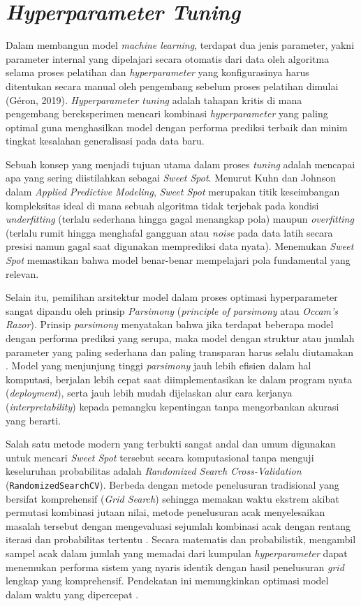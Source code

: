 \section{\textit{Hyperparameter Tuning}}\label{sec:hyperparameter_tuning}

Dalam membangun model \textit{machine learning}, terdapat dua jenis parameter, yakni parameter internal yang dipelajari secara otomatis dari data oleh algoritma selama proses pelatihan dan \textit{hyperparameter} yang konfigurasinya harus ditentukan secara manual oleh pengembang sebelum proses pelatihan dimulai (Géron, 2019). \textit{Hyperparameter tuning} adalah tahapan kritis di mana pengembang bereksperimen mencari kombinasi \textit{hyperparameter} yang paling optimal guna menghasilkan model dengan performa prediksi terbaik dan minim tingkat kesalahan generalisasi pada data baru.

Sebuah konsep yang menjadi tujuan utama dalam proses \textit{tuning} adalah mencapai apa yang sering diistilahkan sebagai \textit{Sweet Spot}. Menurut Kuhn dan Johnson  \cite{kuhn2013applied} dalam \textit{Applied Predictive Modeling}, \textit{Sweet Spot} merupakan titik keseimbangan kompleksitas ideal di mana sebuah algoritma tidak terjebak pada kondisi \textit{underfitting} (terlalu sederhana hingga gagal menangkap pola) maupun \textit{overfitting} (terlalu rumit hingga menghafal gangguan atau \textit{noise} pada data latih secara presisi namun gagal saat digunakan memprediksi data nyata). Menemukan \textit{Sweet Spot} memastikan bahwa model benar-benar mempelajari pola fundamental yang relevan.

Selain itu, pemilihan arsitektur model dalam proses optimasi hyperparameter sangat dipandu oleh prinsip \textit{Parsimony} (\textit{principle of parsimony} atau \textit{Occam's Razor}). Prinsip \textit{parsimony} menyatakan bahwa jika terdapat beberapa model dengan performa prediksi yang serupa, maka model dengan struktur atau jumlah parameter yang paling sederhana dan paling transparan harus selalu diutamakan \cite{kuhn2013applied}. Model yang menjunjung tinggi \textit{parsimony} jauh lebih efisien dalam hal komputasi, berjalan lebih cepat saat diimplementasikan ke dalam program nyata (\textit{deployment}), serta jauh lebih mudah dijelaskan alur cara kerjanya (\textit{interpretability}) kepada pemangku kepentingan tanpa mengorbankan akurasi yang berarti.

Salah satu metode modern yang terbukti sangat andal dan umum digunakan untuk mencari \textit{Sweet Spot} tersebut secara komputasional tanpa menguji keseluruhan probabilitas adalah \textit{Randomized Search Cross-Validation} (\texttt{RandomizedSearchCV}). Berbeda dengan metode penelusuran tradisional yang bersifat komprehensif (\textit{Grid Search}) sehingga memakan waktu ekstrem akibat permutasi kombinasi jutaan nilai, metode penelusuran acak menyelesaikan masalah tersebut dengan mengevaluasi sejumlah kombinasi acak dengan rentang iterasi dan probabilitas tertentu \cite{bergstra2012random}. Secara matematis dan probabilistik, mengambil sampel acak dalam jumlah yang memadai dari kumpulan \textit{hyperparameter} dapat menemukan performa sistem yang nyaris identik dengan hasil penelusuran \textit{grid} lengkap yang komprehensif. Pendekatan ini memungkinkan optimasi model dalam waktu yang dipercepat \cite{raschka2017python}.

